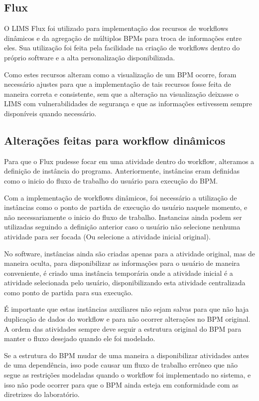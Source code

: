 \subsection{Flux}

O LIMS Flux foi utilizado para implementação dos recursos de workflows dinâmicos e da agregação de múltiplos BPMs para troca de informações entre eles. Sua utilização foi feita pela facilidade na criação de workflows dentro do próprio software e a alta personalização disponibilizada.

Como estes recursos alteram como a visualização de um BPM ocorre, foram necessário ajustes para que a implementação de tais recursos fosse feita de maneira correta e consistente, sem que a alteração na visualização deixasse o LIMS com vulnerabilidades de segurança e que as informações estivessem sempre disponíveis quando necessário.

\subsection{Alterações feitas para workflow dinâmicos}

Para que o Flux pudesse focar em uma atividade dentro do workflow, alteramos a definição de instância do programa. Anteriormente, instâncias eram definidas como o inicio do fluxo de trabalho do usuário para execução do BPM.

Com a implementação de workflows dinâmicos, foi necessário a utilização de instâncias como o ponto de partida de execução do usuário naquele momento, e não necessariamente o inicio do fluxo de trabalho. Instancias ainda podem ser utilizadas seguindo a definição anterior caso o usuário não selecione nenhuma atividade para ser focada (Ou selecione a atividade inicial original).

No software, instâncias ainda são criadas apenas para a atividade original, mas de maneira oculta, para disponibilizar as informações para o usuário de maneira conveniente, é criado uma instância temporária onde a atividade inicial é a atividade selecionada pelo usuário, disponibilizando esta atividade centralizada como ponto de partida para sua execução.

É importante que estas instâncias auxiliares não sejam salvas para que não haja duplicação de dados do workflow e para não ocorrer alterações no BPM original. A ordem das atividades sempre deve seguir a estrutura original do BPM para manter o fluxo desejado quando ele foi modelado.

Se a estrutura do BPM mudar de uma maneira a disponibilizar atividades antes de uma dependência, isso pode causar um fluxo de trabalho errôneo que não segue as restrições modeladas quando o workflow foi implementado no sistema, e isso não pode ocorrer para que o BPM ainda esteja em conformidade com as diretrizes do laboratório.

